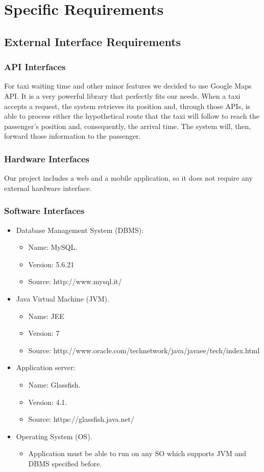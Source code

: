 \section{Specific Requirements}
	\subsection{External Interface Requirements}
		\subsubsection{API Interfaces}
			For taxi waiting time and other minor features we decided to use Google Maps API.
			It is a very powerful library that perfectly fits our needs.
			When a taxi accepts a request, the system retrieves its position and, through
			those APIs, is able to process either the hypothetical route that the taxi will
			follow to reach the passenger's position and, consequently, the arrival time.
			The system will, then, forward those information to the passenger.
		\subsubsection{Hardware Interfaces}
			Our project includes a web and a mobile application, so it does not require
			any external hardware interface.
		\subsubsection{Software Interfaces}
			\begin{itemize}
				\item Database Management System (DBMS):
				\begin{itemize}
					\item Name: MySQL.
					\item Version: 5.6.21
					\item Source: http://www.mysql.it/
				\end{itemize}
				\item Java Virtual Machine (JVM).
				\begin{itemize}
					\item Name: JEE
					\item Version: 7
					\item Source: http://www.oracle.com/technetwork/java/javaee/tech/index.html
				\end{itemize}
				\item Application server:
				\begin{itemize}
					\item Name: Glassfish.
					\item Version: 4.1.
					\item Source: https://glassfish.java.net/
				\end{itemize}
				\item Operating System (OS).
				\begin{itemize}
					\item Application must be able to run on any SO which supports JVM and DBMS specified before.
				\end{itemize}
			\end{itemize}
